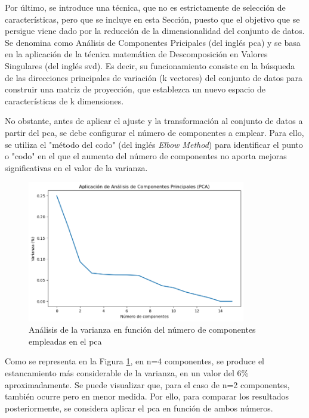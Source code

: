 \vspace{3mm}

Por último, se introduce una técnica, que no es estrictamente de selección de características, pero que se incluye en esta Sección, puesto que el objetivo que se persigue viene dado por la reducción de la dimensionalidad del conjunto de datos. Se denomina como Análisis de Componentes Pricipales (del inglés \gls{pca}) \cite{pca} y se basa en la aplicación de la técnica matemática de Descomposición en Valores Singulares (del inglés \gls{svd}). Es decir, su funcionamiento consiste en la búsqueda de las direcciones principales de variación (k vectores) del conjunto de datos para construir una matriz de proyección, que establezca un nuevo espacio de características de k dimensiones.

\vspace{3mm}

No obstante, antes de aplicar el ajuste y la transformación al conjunto de datos a partir del \gls{pca}, se debe configurar el número de componentes a emplear. Para ello, se utiliza el "método del codo" (del inglés \textit{Elbow Method}) para identificar el punto o "codo" en el que el aumento del número de componentes no aporta mejoras significativas en el valor de la varianza. 

\vspace{3mm}

\begin{figure}[H]
  \centering
  \includegraphics[width=0.85\textwidth]{img/desarrollo/pca.png}
  \caption{Análisis de la varianza en función del número de componentes empleadas en el \gls{pca}}
  \label{fig:pca}
\end{figure}

\vspace{3mm}

Como se representa en la Figura \ref{fig:pca}, en n=4 componentes, se produce el estancamiento más considerable de la varianza, en un valor del 6\% aproximadamente. Se puede visualizar que, para el caso de n=2 componentes, también ocurre pero en menor medida. Por ello, para comparar los resultados posteriormente, se considera aplicar el \gls{pca} en función de ambos números.

